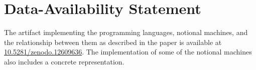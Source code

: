 \section*{Data-Availability Statement}
The artifact implementing
the programming languages, notional machines, and the relationship between them as described in the paper
is available at
\href{https://zenodo.org/doi/10.5281/zenodo.12609636}{10.5281/zenodo.12609636}.
The implementation of some of the notional machines also includes a concrete representation.

